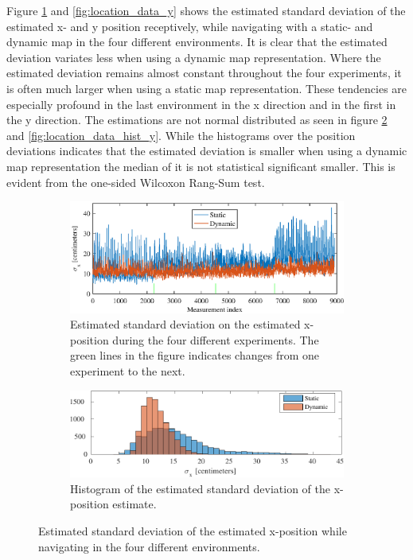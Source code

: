 Figure \ref{fig:location_data_x} and \ref{fig:location_data_y} shows the estimated standard deviation of the estimated x- and y position receptively, while navigating with a static- and dynamic map in the four different environments. 
It is clear that the estimated deviation variates less when using a dynamic map representation.
Where the estimated deviation remains almost constant throughout the four experiments, it is often much larger when using a static map representation. 
These tendencies are especially profound in the last environment in the x direction and in the first in the y direction. 
The estimations are not normal distributed as seen in figure \ref{fig:location_data_hist_x} and \ref{fig:location_data_hist_y}.
While the histograms over the position deviations indicates that the estimated deviation is smaller when using a dynamic map representation the median of it is not statistical significant smaller. This is evident from the one-sided Wilcoxon Rang-Sum test.
\begin{figure}[htbp]
	\begin{subfigure}[t]{1\textwidth}	
		\centering	
		\includegraphics[scale=1.0]{chapters/evaluation/figures/location_data_x}	
		\caption{Estimated standard deviation on the estimated x-position during the four different experiments. The green lines in the figure indicates changes from one experiment to the next.}
		\label{fig:location_data_x}
	\end{subfigure}
	
	\begin{subfigure}[t]{1\textwidth}
		\centering
		\includegraphics[scale=1.0]{chapters/evaluation/figures/location_data_hist_x-crop}
		\caption{Histogram of the estimated standard deviation of the x-position estimate.}
		\label{fig:location_data_hist_x}
	\end{subfigure}
	\caption{Estimated standard deviation of the estimated x-position while navigating in the four different environments.}
	\label{fig:location_x_evaluation}
\end{figure}

